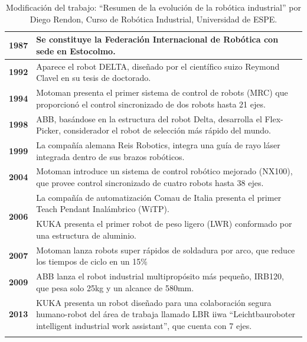 \begin{longtable}[c]{c m{12cm}}
     \textbf{1987} & Se constituye la Federación Internacional de Robótica con sede en Estocolmo. \\ \hline
     \textbf{1992} & Aparece el robot DELTA, diseñado por el científico suizo Reymond Clavel en su tesis de doctorado. \\ \hline
     \textbf{1994} & Motoman presenta el primer sistema de control de robots (MRC) que proporcionó el control sincronizado de dos robots hasta 21 ejes. \\ \hline
     \textbf{1998} & ABB, basándose en la estructura del robot Delta, desarrolla el Flex-Picker, considerador el robot de selección más rápido del mundo. \\ \hline
     \textbf{1999} & La compañía alemana Reis Robotics, integra una guía de rayo láser integrada dentro de sus brazos robóticos. \\ \hline
     \textbf{2004} & Motoman introduce un sistema de control robótico mejorado (NX100), que provee control sincronizado de cuatro robots hasta 38 ejes. \\ \hline
     \multirow{2}{*}{\textbf{2006}} & La compañía de automatización Comau de Italia presenta el primer Teach Pendant Inalámbrico (WiTP). \\ \cline{2-2}
        & KUKA presenta el primer robot de peso ligero (LWR) conformado por una estructura de aluminio. \\ \hline
     \textbf{2007} & Motoman lanza robots super rápidos de soldadura por arco, que reduce los tiempos de ciclo en un 15\% 
     \\ \hline
     \textbf{2009} &  ABB lanza el robot industrial multipropósito más pequeño, IRB120, que pesa solo 25kg y un alcance de 580mm. \\ \hline
     \textbf{2013} & KUKA presenta un robot diseñado para una colaboración segura humano-robot del área de trabaja llamado LBR iiwa “Leichtbauroboter intelligent industrial work assistant”, que cuenta con 7 ejes. \\ \hline
    \caption{Modificación del trabajo: “Resumen de la evolución de la robótica industrial” por Diego Rendon, Curso de Robótica Industrial, Universidad de ESPE.}
 \end{longtable}
 
